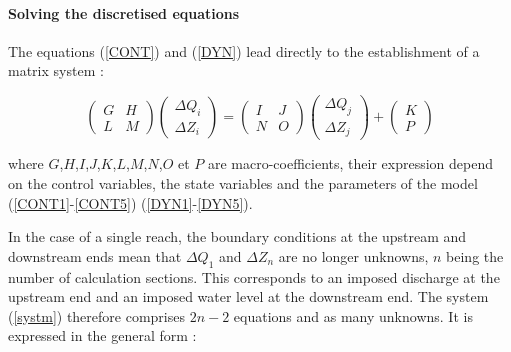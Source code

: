 \paragraph{Solving the discretised equations\\}

\hspace*{1cm}

The equations (\ref{CONT}) and (\ref{DYN}) lead directly to the establishment of a matrix system :

\begin{equation}
 \label{systm}
 \left(
    \begin{array}{cc}
       G & H \\
       L & M
    \end{array}
 \right)
 \left( 
    \begin{array}{c}
       \Delta Q_i \\
       \Delta Z_i
    \end{array}
 \right)
 =
  \left(
    \begin{array}{cc}
       I & J \\
       N & O
    \end{array}
 \right)
 \left(
    \begin{array}{c}
       \Delta Q_j \\
       \Delta Z_j
    \end{array}
 \right)
 +
 \left(
    \begin{array}{c}
       K \\
       P
    \end{array}
 \right)
\end{equation}

\vspace{0.5cm}

where $G$,$H$,$I$,$J$,$K$,$L$,$M$,$N$,$O$ et $P$ are macro-coefficients, their expression 
depend on the control variables, the state variables and the parameters of the model (\ref{CONT1}-\ref{CONT5}) (\ref{DYN1}-\ref{DYN5}).

\vspace{0.5cm}

In the case of a single reach, the boundary conditions at the upstream and downstream ends mean that $\Delta Q_1$ and $\Delta Z_n$ are no longer unknowns, $n$ being the number of calculation sections. This corresponds to an imposed discharge at the upstream end and an imposed water level at the downstream end. The system (\ref{systm}) therefore comprises $2n-2$ equations and as many unknowns. It is expressed in the general form : 

